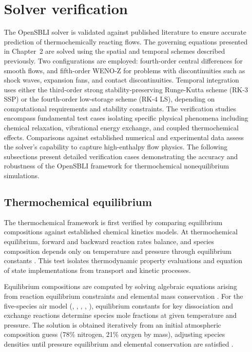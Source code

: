 \newpage

\section{Solver verification}

The OpenSBLI solver is validated against published literature to ensure accurate prediction of thermochemically reacting flows. The governing equations presented in Chapter~2 are solved using the spatial and temporal schemes described previously. Two configurations are employed: fourth-order central differences for smooth flows, and fifth-order WENO-Z for problems with discontinuities such as shock waves, expansion fans, and contact discontinuities. Temporal integration uses either the third-order strong stability-preserving Runge-Kutta scheme (RK-3 SSP) or the fourth-order low-storage scheme (RK-4 LS), depending on computational requirements and stability constraints. The verification studies encompass fundamental test cases isolating specific physical phenomena including chemical relaxation, vibrational energy exchange, and coupled thermochemical effects. Comparisons against established numerical and experimental data assess the solver's capability to capture high-enthalpy flow physics. The following subsections present detailed verification cases demonstrating the accuracy and robustness of the OpenSBLI framework for thermochemical nonequilibrium simulations.


\subsection{Thermochemical equilibrium}

The thermochemical framework is first verified by comparing equilibrium compositions against established chemical kinetics models. At thermochemical equilibrium, forward and backward reaction rates balance, and species composition depends only on temperature and pressure through equilibrium constants \citep{Anderson2019}. This test isolates thermodynamic property evaluations and equation of state implementations from transport and kinetic processes.

Equilibrium compositions are computed by solving algebraic equations arising from reaction equilibrium constraints and elemental mass conservation \citep{Park1993}. For the five-species air model (, , , , ), equilibrium constants for key dissociation and exchange reactions determine species mole fractions at given temperature and pressure. The solution is obtained iteratively from an initial atmospheric composition guess (78\% nitrogen, 21\% oxygen by mass), adjusting species densities until pressure equilibrium and elemental conservation are satisfied \citep{PrabhuErickson1988}.

